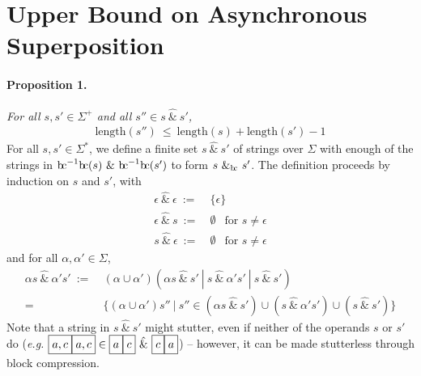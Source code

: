 \documentclass[a4paper,11pt]{article}
\newcommand{\bc}{{\rm b\!c}}
\newcommand{\vph}[1]{\vphantom{#1}}
\begin{document}
\section{Upper Bound on Asynchronous Superposition}
\paragraph{Proposition 1.} {\sl For all  $s, s' \in \Sigma^+$
and all $s''\in s\ \hat{\&}\ s'$,}
\begin{align*}
\mbox{length}(s'')\ \leq\ \mbox{length}(s) + \mbox{length}(s') -1
\end{align*}
\noindent
For all $s,s'\in \Sigma^{\ast}$, we define a finite set
$s~\hat{\&}~s'$ of strings over $\Sigma$ with enough of 
the strings in $\bc^{-1}\bc(s)~\&~\bc^{-1}\bc(s')$
to form $s~\&_{\bc}~s'$.
The definition proceeds by induction on $s$ and $s'$, with
\begin{align*}
\epsilon\ \hat{\&}\ \epsilon \ :=& \ \{\epsilon\}\\
\epsilon\ \hat{\&}\ s \ :=& \ \emptyset\ \ \mbox{ for } s\neq\epsilon\\
s\ \hat{\&}\ \epsilon \ :=& \ \emptyset\ \ \mbox{ for } s\neq\epsilon
\end{align*}
and for all $\alpha,\alpha'\in \Sigma$,
\begin{align*}
\alpha s~\hat{\&}~\alpha's' \ :=& \ 
(\alpha\cup \alpha')(\alpha s\ \hat{\&}\ s'
\ | \ s~\hat{\&}~\alpha's' \ | \  s~\hat{\&}~s')\\
=&~\{(\alpha\cup\alpha')s''\ | \ s''\in (\alpha s~\hat{\&}~s') \cup 
(s~\hat{\&}~\alpha's') \cup (s~\hat{\&}~s')\}
\end{align*}
Note that a string in $s\ \hat{\&}\ s'$ might stutter, even if neither of the 
operands $s$ or $s'$ do
(\textit{e.g.} $\fbox{$a,c\vph{,'}$}\fbox{$a,c\vph{,'}$}\in
\fbox{$a\vph{,'}$}\fbox{$c\vph{,'}$}\ \hat{\&}\ 
\fbox{$c\vph{,'}$}\fbox{$a\vph{,'}$}$)
-- however, it can be made stutterless through block compression.
\end{document}
